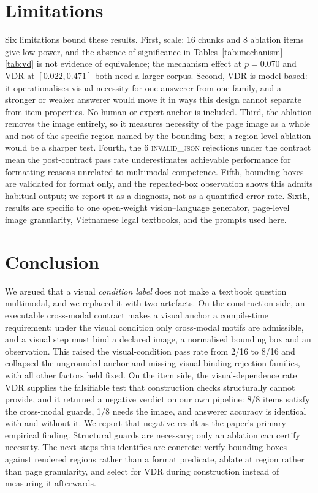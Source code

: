 \documentclass[conference]{IEEEtran}
\newcommand{\vdrate}{\mathrm{VDR}}
\begin{document}
\section{Limitations}
Six limitations bound these results. First, scale: 16 chunks and 8 ablation items
give low power, and the absence of significance in
Tables~\ref{tab:mechanism}--\ref{tab:vd} is not evidence of equivalence; the
mechanism effect at $p=0.070$ and $\vdrate$ at $[0.022,0.471]$ both need a larger
corpus. Second, $\vdrate$ is model-based: it operationalises visual necessity for
one answerer from one family, and a stronger or weaker answerer would move it in
ways this design cannot separate from item properties. No human or expert anchor is
included. Third, the ablation removes the image entirely, so it measures necessity
of the page image as a whole and not of the specific region named by the bounding
box; a region-level ablation would be a sharper test. Fourth, the 6
\textsc{invalid\_json} rejections under the contract mean the post-contract pass
rate underestimates achievable performance for formatting reasons unrelated to
multimodal competence. Fifth, bounding boxes are validated for format only, and the
repeated-box observation shows this admits habitual output; we report it as a
diagnosis, not as a quantified error rate. Sixth, results are specific to one
open-weight vision--language generator, page-level image granularity, Vietnamese
legal textbooks, and the prompts used here.

\section{Conclusion}
We argued that a visual \emph{condition label} does not make a textbook question
multimodal, and we replaced it with two artefacts. On the construction side, an
executable cross-modal contract makes a visual anchor a compile-time requirement:
under the visual condition only cross-modal motifs are admissible, and a visual
step must bind a declared image, a normalised bounding box and an observation. This
raised the visual-condition pass rate from 2/16 to 8/16 and collapsed the
ungrounded-anchor and missing-visual-binding rejection families, with all other
factors held fixed. On the item side, the visual-dependence rate $\vdrate$ supplies
the falsifiable test that construction checks structurally cannot provide, and it
returned a negative verdict on our own pipeline: 8/8 items satisfy the cross-modal
guards, 1/8 needs the image, and answerer accuracy is identical with and without
it. We report that negative result as the paper's primary empirical finding.
Structural guards are necessary; only an ablation can certify necessity. The next
steps this identifies are concrete: verify bounding boxes against rendered regions
rather than a format predicate, ablate at region rather than page granularity, and
select for $\vdrate$ during construction instead of measuring it afterwards.
\end{document}
